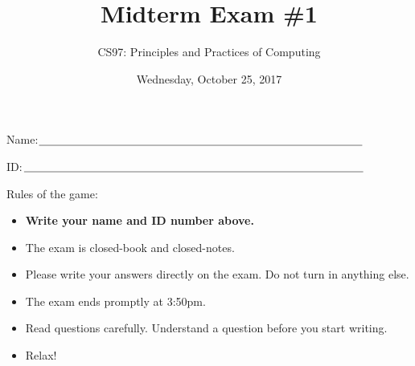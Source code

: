 \documentclass[11pt]{article}
\title{Midterm Exam \#1}
\author{CS97: Principles and Practices of Computing}
\date{Wednesday, October 25, 2017}
\begin{document}
  
\maketitle
\thispagestyle{empty}
\pagestyle{empty}

  \begin{flushright}
\end{flushright}

\vspace{.5in}

Name:$\underline{\mbox{\hspace{4in}}}$

\vspace{.5in}

ID:$\underline{\mbox{\hspace{4.2in}}}$

\vspace{0.5in}

Rules of the game:

\begin{itemize}
  \item {\bf Write your name and ID number above.}
\item The exam is closed-book and closed-notes.

\item Please write your answers
directly on the exam.  Do not turn in anything else.



  
\item The exam ends promptly at 3:50pm.
  
\item Read questions carefully.  Understand a question before you
  start writing. %

\item Relax!
\end{itemize}
\end{document}
